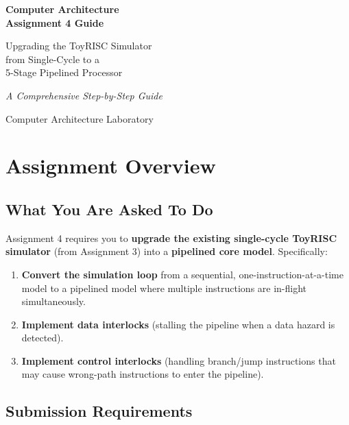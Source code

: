 \documentclass[12pt,a4paper]{article}
\begin{document}
\begin{titlepage}
\centering
\vspace*{2cm}
{\Huge\bfseries Computer Architecture\\[0.5em]Assignment 4 Guide\par}
\vspace{1.5cm}
{\LARGE Upgrading the ToyRISC Simulator\\from Single-Cycle to a\\5-Stage Pipelined Processor\par}
\vspace{2cm}
{\Large\itshape A Comprehensive Step-by-Step Guide\par}
\vspace{3cm}
{\large Computer Architecture Laboratory\par}
\vfill
\end{titlepage}

\tableofcontents
\newpage

\section{Assignment Overview}

\subsection{What You Are Asked To Do}

Assignment 4 requires you to \textbf{upgrade the existing single-cycle ToyRISC simulator} (from Assignment 3) into a \textbf{pipelined core model}. Specifically:

\begin{enumerate}[label=\arabic*.]
    \item \textbf{Convert the simulation loop} from a sequential, one-instruction-at-a-time model to a pipelined model where multiple instructions are in-flight simultaneously.
    \item \textbf{Implement data interlocks} (stalling the pipeline when a data hazard is detected).
    \item \textbf{Implement control interlocks} (handling branch/jump instructions that may cause wrong-path instructions to enter the pipeline).
\end{enumerate}

\subsection{Submission Requirements}
\end{document}

